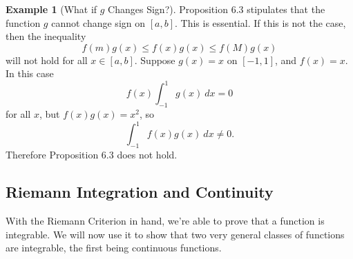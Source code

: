 \documentclass{article}
\theoremstyle{definition}
\newtheorem{example}{Example}[section]
\begin{document}
\begin{example}[What if $ g $ Changes Sign?]
	Proposition 6.3 stipulates that the function $ g $ cannot change sign on $ [a,b] $. This is essential. If this is not the case, then the inequality  
	$$f(m)g(x)\le f(x)g(x)\le f(M)g(x)$$ will not hold for all $ x\in [a,b] $. Suppose $ g(x)=x $ on $ [-1,1] $, and $ f(x)=x $. In this case $$f(x)\int_{-1}^{1}g(x)\ dx=0 $$ for all $ x $, but $ f(x)g(x)=x^2 $, so $$ \int_{-1}^{1}f(x)g(x)\ dx\neq 0 .$$ Therefore Proposition 6.3 does not hold. 
\end{example}
\subsection{Riemann Integration and Continuity}
With the Riemann Criterion in hand, we're able to prove that a function is integrable. We will now use it to show that two very general classes of functions are integrable, the first being continuous functions.
\end{document}
